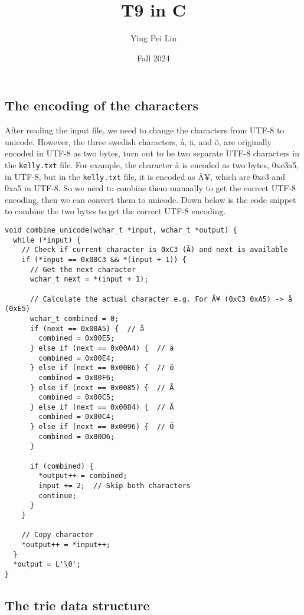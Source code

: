 \documentclass[a4paper,11pt]{article}
\begin{document}
\title{
  \textbf{T9 in C}
}
\author{Ying Pei Lin}
\date{Fall 2024}

\maketitle

\subsection*{The encoding of the characters}

After reading the input file, we need to change the characters from UTF-8 to unicode.
However, the three swedish characters, å, ä, and ö, are originally encoded in UTF-8 as two bytes,
turn out to be two separate UTF-8 characters in the {\tt kelly.txt} file. For example, the character
å is encoded as two bytes, 0xc3a5, in UTF-8, but in the {\tt kelly.txt} file, it is encoded as
Ã¥, which are 0xc3 and 0xa5 in UTF-8. So we need to combine them manually to get the correct UTF-8 encoding, 
then we can convert them to unicode. Down below is the code snippet to combine the two bytes to get the correct UTF-8 encoding.

\begin{verbatim}
void combine_unicode(wchar_t *input, wchar_t *output) {
  while (*input) {
    // Check if current character is 0xC3 (Ã) and next is available
    if (*input == 0x00C3 && *(input + 1)) {
      // Get the next character
      wchar_t next = *(input + 1);
      
      // Calculate the actual character e.g. For Ã¥ (0xC3 0xA5) -> å (0xE5)
      wchar_t combined = 0;
      if (next == 0x00A5) {  // å
        combined = 0x00E5;
      } else if (next == 0x00A4) {  // ä
        combined = 0x00E4;
      } else if (next == 0x00B6) {  // ö
        combined = 0x00F6;
      } else if (next == 0x0085) {  // Å
        combined = 0x00C5;
      } else if (next == 0x0084) {  // Ä
        combined = 0x00C4;
      } else if (next == 0x0096) {  // Ö
        combined = 0x00D6;
      }

      if (combined) {
        *output++ = combined;
        input += 2;  // Skip both characters
        continue;
      }
    }
    
    // Copy character
    *output++ = *input++;
  }
  *output = L'\0';
}
\end{verbatim}

\subsection*{The trie data structure}
\end{document}
